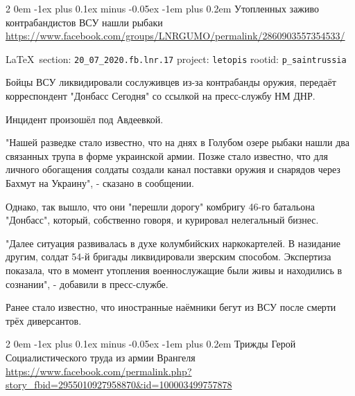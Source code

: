 \documentclass[a4paper,11pt]{extreport}
\makeatletter
\renewcommand\subsection{%
  \clearpage
    \@startsection{subsection}%
    {2}%
    {0em}%
    {-1ex plus 0.1ex minus -0.05ex}%
    {-1em plus 0.2em}%
    {\scshape\bfseries\Large}%
}
\makeatother
\begin{document}
 
\subsection{Утопленных заживо контрабандистов ВСУ нашли рыбаки}
\label{sec:20_07_2020.fb.lnr.17}
\url{https://www.facebook.com/groups/LNRGUMO/permalink/2860903557354533/}
  
\vspace{0.5cm}
{\small\LaTeX~section: \verb|20_07_2020.fb.lnr.17| project: \verb|letopis| rootid: \verb|p_saintrussia|}
\vspace{0.5cm}
  

Бойцы ВСУ ликвидировали сослуживцев из-за контрабанды оружия, передаёт
корреспондент "Донбасс Сегодня" со ссылкой на пресс-службу НМ ДНР.

Инцидент произошёл под Авдеевкой.

"Нашей разведке стало известно, что на днях в Голубом озере рыбаки нашли два связанных трупа в форме украинской армии. Позже стало известно, что для личного обогащения солдаты создали канал поставки оружия и снарядов через Бахмут на Украину", - сказано в сообщении.

Однако, так вышло, что они "перешли дорогу" комбригу 46-го батальона "Донбасс", который, собственно говоря, и курировал нелегальный бизнес.

"Далее ситуация развивалась в духе колумбийских наркокартелей. В назидание другим, солдат 54-й бригады ликвидировали зверским способом. Экспертиза показала, что в момент утопления военнослужащие были живы и находились в сознании", - добавили в пресс-службе.

Ранее стало известно, что иностранные наёмники бегут из ВСУ после смерти трёх диверсантов.

 
 
\subsection{Трижды Герой Социалистического труда из армии Врангеля}
\label{sec:20_07_2020.fb.babenko_galina.alexandrov}
\url{https://www.facebook.com/permalink.php?story_fbid=2955010927958870&id=100003499757878}
  
\end{document}
